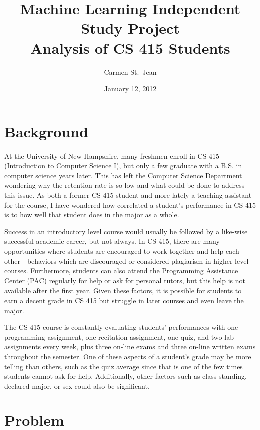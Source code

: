 \documentclass[letterpaper,11pt]{article}
\begin{document}
\title{Machine Learning Independent Study Project\\ Analysis of CS 415 Students}
\date{January 12, 2012}
\author{Carmen St.\ Jean}

\maketitle

\section{Background}

At the University of New Hampshire, many freshmen enroll in CS 415 (Introduction to Computer Science I), but only a few graduate with a B.S. in computer science years later.  This has left the Computer Science Department wondering why the retention rate is so low and what could be done to address this issue.  As both a former CS 415 student and more lately a teaching assistant for the course, I have wondered how correlated a student's performance in CS 415 is to how well that student does in the major as a whole.

Success in an introductory level course would usually be followed by a like-wise successful academic career, but not always.  In CS 415, there are many opportunities where students are encouraged to work together and help each other - behaviors which are discouraged or considered plagiarism in higher-level courses.  Furthermore, students can also attend the Programming Assistance Center (PAC) regularly for help or ask for personal tutors, but this help is not available after the first year.  Given these factors, it is possible for students to earn a decent grade in CS 415 but struggle in later courses and even leave the major.

The CS 415 course is constantly evaluating students' performances with one programming assignment, one recitation assignment, one quiz, and two lab assignments every week, plus three on-line exams and three on-line written exams throughout the semester.  One of these aspects of a student's grade may be more telling than others, such as the quiz average since that is one of the few times students cannot ask for help.  Additionally, other factors such as class standing, declared major, or sex could also be significant.

\section{Problem}
\end{document}
